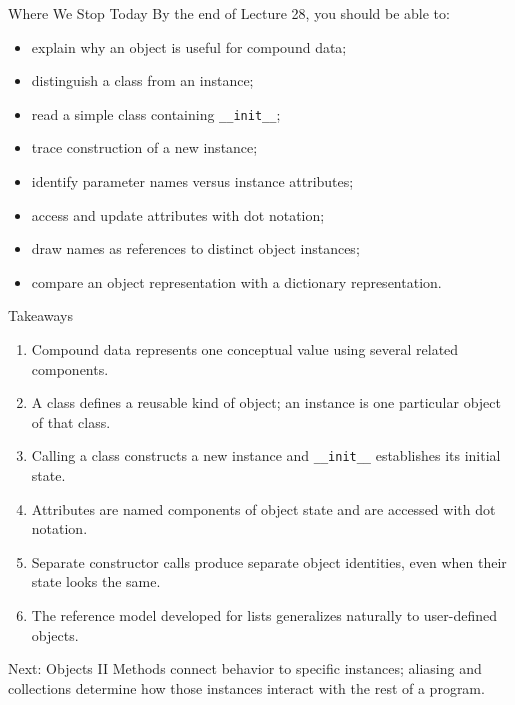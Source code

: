 \documentclass[aspectratio=169,10pt]{beamer}
\begin{document}
\begin{frame}{Where We Stop Today}
  By the end of Lecture 28, you should be able to:

  \begin{itemize}
    \item explain why an object is useful for compound data;
    \item distinguish a class from an instance;
    \item read a simple class containing \texttt{\_\_init\_\_};
    \item trace construction of a new instance;
    \item identify parameter names versus instance attributes;
    \item access and update attributes with dot notation;
    \item draw names as references to distinct object instances;
    \item compare an object representation with a dictionary representation.
  \end{itemize}
\end{frame}

\begin{frame}{Takeaways}
  \begin{enumerate}
    \item Compound data represents one conceptual value using several related components.
    \item A class defines a reusable kind of object; an instance is one particular object of that class.
    \item Calling a class constructs a new instance and \texttt{\_\_init\_\_} establishes its initial state.
    \item Attributes are named components of object state and are accessed with dot notation.
    \item Separate constructor calls produce separate object identities, even when their state looks the same.
    \item The reference model developed for lists generalizes naturally to user-defined objects.
  \end{enumerate}

  \begin{block}{Next: Objects II}
    Methods connect behavior to specific instances; aliasing and collections determine how those instances interact with the rest of a program.
  \end{block}
\end{frame}
\end{document}
